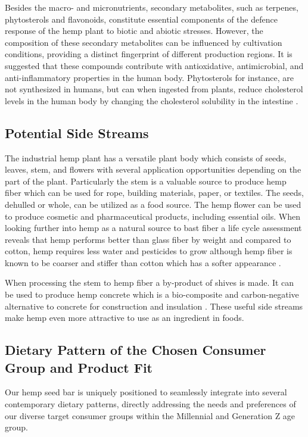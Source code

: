 \vspace{1em}
Besides the macro- and micronutrients, secondary metabolites, such as terpenes, phytosterols and flavonoids, constitute essential components of the defence response of the hemp plant to biotic and abiotic stresses. However, the composition of these secondary metabolites can be influenced by cultivation conditions, providing a distinct fingerprint of different production regions. It is suggested that these compounds contribute with antioxidative, antimicrobial, and anti-inflammatory properties in the human body. Phytosterols for instance, are not synthesized in humans, but can when ingested from plants, reduce cholesterol levels in the human body by changing the cholesterol solubility in the intestine \cite*{art_21_hemp_review}.

\subsection{Potential Side Streams}
The industrial hemp plant has a versatile plant body which consists of seeds, leaves, stem, and flowers with several application opportunities depending on the part of the plant. Particularly the stem is a valuable source to produce hemp fiber which can be used for rope, building materials, paper, or textiles. The seeds, dehulled or whole, can be utilized as a food source. The hemp flower can be used to produce cosmetic and pharmaceutical products, including essential oils. When looking further into hemp as a natural source to bast fiber a life cycle assessment reveals that hemp performs better than glass fiber by weight and compared to cotton, hemp requires less water and pesticides to grow although hemp fiber is known to be coarser and stiffer than cotton which has a softer appearance \cite*{Kaur2023SustainabilityIndustrialHemp}. 

\vspace{1em}
When processing the stem to hemp fiber a by-product of shives is made. It can be used to produce hemp concrete which is a bio-composite and carbon-negative alternative to concrete for construction and insulation \cite*{Yano2023HempSustainableFoods}. These useful side streams make hemp even more attractive to use as an ingredient in foods. 

\subsection{Dietary Pattern of the Chosen Consumer Group and Product Fit}
Our hemp seed bar is uniquely positioned to seamlessly integrate into several contemporary dietary patterns, directly addressing the needs and preferences of our diverse target consumer groups within the Millennial and Generation Z age group.


